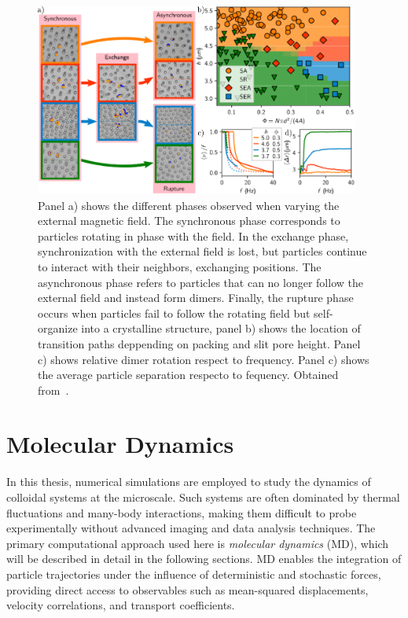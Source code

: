 \begin{figure}
  \begin{center}
    \includegraphics[width=0.95\textwidth]{figures/helenapathphases.pdf}
  \end{center}
\caption[Colloidal states for different packing, height, and frequency.]{Panel a) shows the different phases observed when varying the external magnetic field. The synchronous phase corresponds to particles rotating in phase with the field. In the exchange phase, synchronization with the external field is lost, but particles continue to interact with their neighbors, exchanging positions. The asynchronous phase refers to particles that can no longer follow the external field and instead form dimers. Finally, the rupture phase occurs when particles fail to follow the rotating field but self-organize into a crystalline structure, panel b) shows the location of transition paths deppending on packing and slit pore height. Panel c) shows relative dimer rotation respect to frequency. Panel c) shows the average particle separation respecto to fequency. Obtained from~\cite{massana2020emergent}.}\label{fig:helenapathphases}
\end{figure}

\section{Molecular Dynamics}

In this thesis, numerical simulations are employed to study the dynamics of colloidal systems at the microscale. Such systems are often dominated by thermal fluctuations and many-body interactions, making them difficult to probe experimentally without advanced imaging and data analysis techniques. The primary computational approach used here is \textit{molecular dynamics} (MD), which will be described in detail in the following sections. MD enables the integration of particle trajectories under the influence of deterministic and stochastic forces, providing direct access to observables such as mean-squared displacements, velocity correlations, and transport coefficients.

